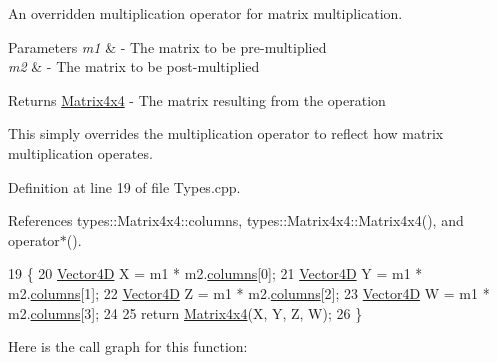 An overridden multiplication operator for matrix multiplication. 


\begin{DoxyParams}{Parameters}
{\em m1} & -\/ The matrix to be pre-\/multiplied \\
\hline
{\em m2} & -\/ The matrix to be post-\/multiplied \\
\hline
\end{DoxyParams}
\begin{DoxyReturn}{Returns}
\hyperlink{structtypes_1_1_matrix4x4}{Matrix4x4} -\/ The matrix resulting from the operation
\end{DoxyReturn}
This simply overrides the multiplication operator to reflect how matrix multiplication operates. 

Definition at line 19 of file Types.\+cpp.



References types\+::\+Matrix4x4\+::columns, types\+::\+Matrix4x4\+::\+Matrix4x4(), and operator$\ast$().


\begin{DoxyCode}
19                                                                   \{
20     \hyperlink{structtypes_1_1_vector4_d}{Vector4D} X = m1 * m2.\hyperlink{structtypes_1_1_matrix4x4_a71eff2a403350446b93f8f11dda7b73e}{columns}[0];
21     \hyperlink{structtypes_1_1_vector4_d}{Vector4D} Y = m1 * m2.\hyperlink{structtypes_1_1_matrix4x4_a71eff2a403350446b93f8f11dda7b73e}{columns}[1];
22     \hyperlink{structtypes_1_1_vector4_d}{Vector4D} Z = m1 * m2.\hyperlink{structtypes_1_1_matrix4x4_a71eff2a403350446b93f8f11dda7b73e}{columns}[2];
23     \hyperlink{structtypes_1_1_vector4_d}{Vector4D} W = m1 * m2.\hyperlink{structtypes_1_1_matrix4x4_a71eff2a403350446b93f8f11dda7b73e}{columns}[3];
24  
25     \textcolor{keywordflow}{return} \hyperlink{structtypes_1_1_matrix4x4}{Matrix4x4}(X, Y, Z, W);
26 \}\end{DoxyCode}


Here is the call graph for this function\+:


